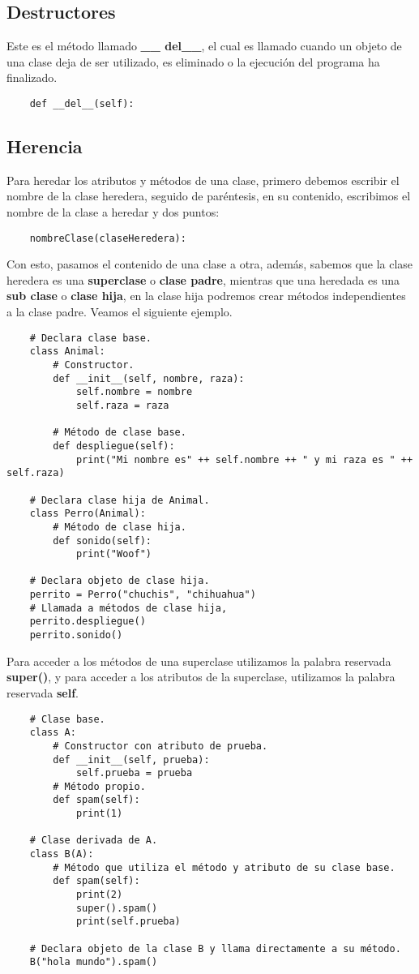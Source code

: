 \subsection{Destructores}

Este es el método llamado \textbf{\_\_ del\_\_}, el cual es llamado cuando un objeto de una clase deja de ser utilizado, es eliminado o la ejecución del programa ha finalizado.
\begin{lstlisting}
    def __del__(self):
\end{lstlisting}


\subsection{Herencia}

Para heredar los atributos y métodos de una clase, primero debemos escribir el nombre de la clase heredera, seguido de paréntesis, en su contenido, escribimos el nombre de la clase a heredar y dos puntos:
\begin{lstlisting}
    nombreClase(claseHeredera):
\end{lstlisting}

Con esto, pasamos el contenido de una clase a otra, además, sabemos que la clase heredera es una \textbf{superclase} o \textbf{clase padre}, mientras que una heredada es una \textbf{sub clase} o \textbf{clase hija}, en la clase hija podremos crear métodos independientes a la clase padre. Veamos el siguiente ejemplo.
\begin{lstlisting}
    # Declara clase base.
    class Animal:
        # Constructor.
        def __init__(self, nombre, raza):
            self.nombre = nombre
            self.raza = raza

        # Método de clase base.
        def despliegue(self):
            print("Mi nombre es" ++ self.nombre ++ " y mi raza es " ++ self.raza)

    # Declara clase hija de Animal.
    class Perro(Animal):
        # Método de clase hija.
        def sonido(self):
            print("Woof")

    # Declara objeto de clase hija.
    perrito = Perro("chuchis", "chihuahua")
    # Llamada a métodos de clase hija,
    perrito.despliegue()
    perrito.sonido()
\end{lstlisting}

Para acceder a los métodos de una superclase utilizamos la palabra reservada \textbf{super()}, y para acceder a los atributos de la superclase, utilizamos la palabra reservada \textbf{self}.
\begin{lstlisting}
    # Clase base.
    class A:
        # Constructor con atributo de prueba.
        def __init__(self, prueba):
            self.prueba = prueba
        # Método propio.
        def spam(self):
            print(1)

    # Clase derivada de A.
    class B(A):
        # Método que utiliza el método y atributo de su clase base.
        def spam(self):
            print(2)
            super().spam()
            print(self.prueba)

    # Declara objeto de la clase B y llama directamente a su método.
    B("hola mundo").spam()
\end{lstlisting}


